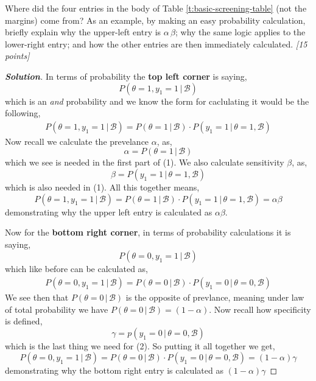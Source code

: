 \documentclass[12pt]{article}
\newcommand{\given}{\, | \,}
\newenvironment{solution}{\begin{proof}[\textbf{\textit{Solution}}] }{\end{proof}}
\begin{document}
\begin{itemize}
\begin{itemize}
Where did the four entries in the body of Table \ref{t:basic-screening-table} (not the margins) come from? As an example, by making an easy probability calculation, briefly explain why the upper-left entry is  $\alpha \, \beta$; why the same logic applies to the lower-right entry; and how the other entries are then immediately calculated. \textit{[15 points]}
\begin{tcolorbox}
    \begin{solution}
        In terms of probability the \textbf{top left corner} is saying,
        \[P(\theta = 1, y_1 = 1 \given \mathcal{B})\]
        which is an \textit{and} probability and we know the form for caclulating it would be the following,
        \begin{align}
            P(\theta = 1, y_1 = 1 \given \mathcal{B}) = P(\theta = 1 \given \mathcal{B}) \cdot P(y_1 = 1 \given \theta = 1, \mathcal{B}) 
        \end{align}
        Now recall we calculate the prevelance $\alpha$, as,
        \[\alpha = P(\theta = 1\given \mathcal{B})\]
        which we see is needed in the first part of (1). We also calculate sensitivity $\beta$, as,
        \[\beta = P(y_1 = 1 \given \theta = 1, \mathcal{B})\]
        which is also needed in (1). All this together means,
        \[P(\theta = 1, y_1 = 1 \given \mathcal{B}) =  P(\theta = 1 \given \mathcal{B}) \cdot P(y_1 = 1 \given \theta = 1, \mathcal{B}) = \alpha \beta\]
        demonstrating why the upper left entry is calculated as $\alpha\beta$.

        Now for the \textbf{bottom right corner}, in terms of probability calculations it is saying,
        \[P(\theta = 0, y_1 = 1 \given \mathcal{B})\]
        which like before can be calculated as,
        \begin{align}
            P(\theta = 0, y_1 = 1 \given \mathcal{B}) = P(\theta = 0 \given \mathcal{B})\cdot P(y_1 = 0\given \theta = 0, \mathcal{B})
        \end{align}
        We see then that $P(\theta = 0 \given \mathcal{B})$ is the opposite of prevlance, meaning under law of total probability we have $P(\theta = 0 \given \mathcal{B}) = (1 - \alpha) $. Now recall how specificity is defined,
        \[\gamma = p(y_1 = 0\given \theta = 0, \mathcal{B})\]
        which is the last thing we need for (2). So putting it all together we get,
        \[P(\theta = 0, y_1 = 1 \given \mathcal{B}) = P(\theta = 0 \given \mathcal{B})\cdot P(y_1 = 0\given \theta = 0, \mathcal{B}) = (1-\alpha)\gamma\] 
        demonstrating why the bottom right entry is calculated as $(1-\alpha)\gamma$


\end{solution}
\end{tcolorbox}
\end{itemize}
\end{itemize}
\end{document}

